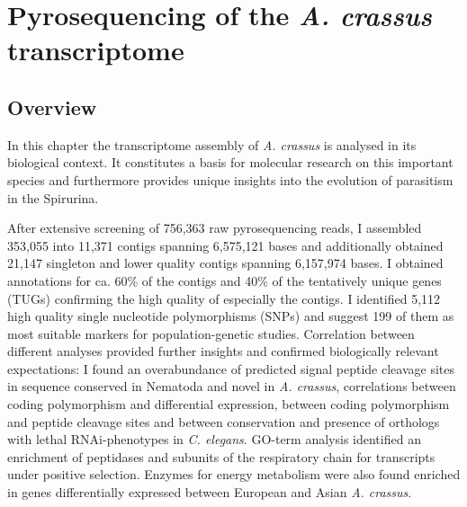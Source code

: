 
\chapter{Pyrosequencing of the \textit{A. crassus}
  transcriptome} %
\label{cha:pyro}


\ifpdf
    \graphicspath{{5_pyro/figures/PNG/}{5_pyro/figures/PDF/}{5_pyro/figures/}}
\else
    \graphicspath{{5_pyro/figures/EPS/}{5_pyro/figures/}}
\fi


\section{Overview}
\label{sec:454-overv}

In this chapter the transcriptome assembly of \textit{A. crassus} is
analysed in its biological context. It constitutes a basis for
molecular research on this important species and furthermore provides
unique insights into the evolution of parasitism in the Spirurina.

After extensive screening of 756,363 raw pyrosequencing reads, I
assembled 353,055 into 11,371 contigs spanning 6,575,121 bases and
additionally obtained 21,147 singleton and lower quality contigs
spanning 6,157,974 bases. I obtained annotations for ca. 60\% of the
contigs and 40\% of the tentatively unique genes (TUGs) confirming the
high quality of especially the contigs. I identified 5,112 high
quality single nucleotide polymorphisms (SNPs) and suggest 199 of them
as most suitable markers for population-genetic studies. Correlation
between different analyses provided further insights and confirmed
biologically relevant expectations: I found an overabundance of
predicted signal peptide cleavage sites in sequence conserved in
Nematoda and novel in \textit{A. crassus}, correlations between coding
polymorphism and differential expression, between coding polymorphism
and peptide cleavage sites and between conservation and presence of
orthologs with lethal RNAi-phenotypes in \textit{C. elegans}. GO-term
analysis identified an enrichment of peptidases and subunits of the
respiratory chain for transcripts under positive selection. Enzymes
for energy metabolism were also found enriched in genes differentially
expressed between European and Asian \textit{A. crassus}.

